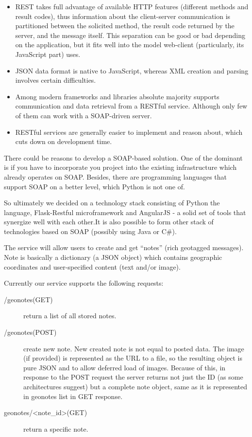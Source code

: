\documentclass[12pt,a4paper]{article}
\begin{document}
\begin{itemize}
\item REST takes full advantage of available HTTP features (different
  methods and result codes), thus information about the client-server
  communication is partitioned between the solicited method, the
  result code returned by the server, and the message itself. This
  separation can be good or bad depending on the application, but it
  fits well into the model web-client (particularly, its JavaScript
  part) uses.
\item JSON data format is native to JavaScript, whereas XML creation
  and parsing involves certain difficulties.
\item Among modern frameworks and libraries absolute majority supports
  communication and data retrieval from a RESTful service. Although
  only few of them can work with a SOAP-driven server.
\item RESTful services are generally easier to implement and reason
  about, which cuts down on development time.
\end{itemize}

There could be reasons to develop a SOAP-based solution. One of the
dominant is if you have to incorporate you project into the existing
infrastructure which already operates on SOAP. Besides, there are
programming languages that support SOAP on a better level, which
Python is not one of.

So ultimately we decided on a technology stack consisting of Python
the language, Flask-Restful microframework and AngularJS - a solid set
of tools that synergize well with each other.It is also possible to
form other stack of technologies based on SOAP (possibly using Java or
C\#).

The service will allow users to create and get ``notes'' (rich geotagged
messages). Note is basically a dictionary (a JSON object) which
contains geographic coordinates and user-specified content (text
and/or image).

Currently our service supports the following requests:

\begin{description}
\item[/geonotes(GET)] return a list of all stored notes.
\item[/geonotes(POST)] create new note. New created note
  is not equal to posted data. The image (if
  provided) is represented as the URL to a file, so the resulting object is
  pure JSON and to allow deferred load of images.
  Because of this, in response to the POST request the server returns
  not just the ID (as some architectures suggest) but a complete note
  object, same as it is represented in geonotes list in GET response.
\item[geonotes/<note\_id>(GET)] return a specific note.
\end{description}
\end{document}

